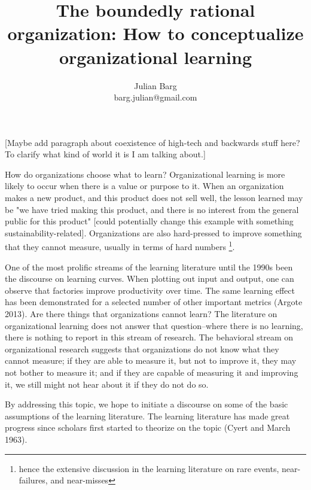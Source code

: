 \documentclass[12pt, man, natbib]{apa6}
\title{The boundedly rational organization: How to conceptualize organizational learning}
\author{Julian Barg\\barg.julian@gmail.com}
\affiliation{Ivey Business School}
\begin{document}
	
	\maketitle
	
	\singlespacing
	
	\section{}	
	
	[Maybe add paragraph about coexistence of high-tech and backwards stuff here? To clarify what kind of world it is I am talking about.]
	
	How do organizations choose what to learn? Organizational learning is more likely to occur when there is a value or purpose to it. When an organization makes a new product, and this product does not sell well, the lesson learned may be "we have tried making this product, and there is no interest from the general public for this product" [could potentially change this example with something sustainability-related]. Organizations are also hard-pressed to improve something that they cannot measure, usually in terms of hard numbers \footnote{hence the extensive discussion in the learning literature on rare events, near-failures, and near-misses}.
	
	One of the most prolific streams of the learning literature until the 1990s been the discourse on learning curves. When plotting out input and output, one can observe that factories improve productivity over time. The same learning effect has been demonstrated for a selected number of other important metrics (Argote 2013). Are there things that organizations cannot learn? The literature on organizational learning does not answer that question--where there is no learning, there is nothing to report in this stream of research. The behavioral stream on organizational research suggests that organizations do not know what they cannot measure; if they are able to measure it, but not to improve it, they may not bother to measure it; and if they are capable of measuring it and improving it, we still might not hear about it if they do not do so.
	
	By addressing this topic, we hope to initiate a discourse on some of the basic assumptions of the learning literature. The learning literature has made great progress since scholars first started to theorize on the topic (Cyert and March 1963). 
	
\end{document}
